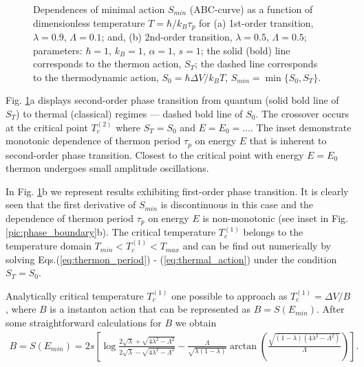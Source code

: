 \documentclass[aps, pre, preprint, groupedaddress, superscriptaddress, showkeys, showpacs] {revtex4-1}
\begin{document}
\begin{figure}[ht]
\begin{minipage}[h]{0.49\linewidth}
\end{minipage}
\caption{Dependences of minimal action $S_{min}$ (ABC-curve) as a function of dimensionless temperature $ T= \hbar / k_B \tau_p$ for (a) 1st-order transition, $\lambda = 0.9$, $\Lambda = 0.1$; and, (b) 2nd-order transition, $\lambda = 0.5$, $\Lambda = 0.5$; parameters: $\hbar = 1$, $k_B = 1$, $\alpha = 1$, $s = 1$; the solid (bold) line corresponds to the thermon action, $S_T$; the dashed line corresponds to the thermodynamic action, $S_0 = \hbar \Delta V / k_B T$, $S_{min} = \min \{S_0, S_T\}$. \label{pic:action_period}}
\end{figure}
%

Fig. \ref{pic:action_period}a displays second-order phase transition from quantum (solid bold line of $S_T$) to thermal (classical) regimes --- dashed bold line of $S_0$.
The crossover occurs at the critical point $T_{c}^{(2)}$ where $S_T = S_0$ and {\red $E = E_0 = \dots$}.
The inset demonstrate monotonic dependence of thermon period $\tau_p$ on energy $E$ that is inherent to second-order phase transition.
Closest to the critical point with energy $E=E_0$ thermon undergoes small amplitude oscillations.  
  
In Fig. \ref{pic:action_period}b we represent results exhibiting first-order phase transition.
It is clearly seen that the first derivative of $S_{min}$ is discontinuous in this case and the dependence of thermon period $\tau_p$ on energy $E$ is non-monotonic (see inset in Fig. \ref{pic:phase_boundary}b).
The critical temperature $T_{c}^{(1)}$ belongs to the temperature domain $T_{min} < T_{c}^{(1)} < T_{max}$ and can be find out numerically by solving Eqs.(\ref{eq:thermon_period}) - (\ref{eq:thermal_action}) under the condition $S_T = S_0$.
 
Analytically critical temperature $T_{c}^{(1)}$ one possible to approach as $T_{c}^{(1)} = \Delta V / B$, where $B$ is a instanton action that can be represented as $B = S(E_{min})$.
After some straightforward calculations for $B$ we obtain
%
\begin{equation}
\begin{array}{c}
B = S(E_{min}) = 2 s \left[ \log \frac{2 \sqrt{\lambda} + \sqrt{4 \lambda^2 - \Lambda^2}}{2 \sqrt{\lambda} - \sqrt{4 \lambda^2 - \Lambda^2}} - \frac{\Lambda}{\sqrt{\lambda (1 - \lambda)}} \arctan \left( \frac{\sqrt{(1 - \lambda) (4 \lambda^2 - \Lambda^2)}}{\Lambda} \right) \right].
\end{array}
\label{eq:B_action}
\end{equation}
%
\end{document}
